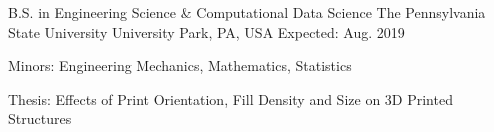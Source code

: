 
\begin{cventries}
	\cventry
	{B.S. in Engineering Science \& Computational Data Science} %
	{The Pennsylvania State University} %
	{University Park, PA, USA} %
	{Expected: Aug. 2019} %
	{
		\begin{cvitems} %
			\item {Minors: Engineering Mechanics, Mathematics, Statistics}
			\item {Thesis: Effects of Print Orientation, Fill Density and Size on 3D Printed Structures}
		\end{cvitems}
	}
\end{cventries}